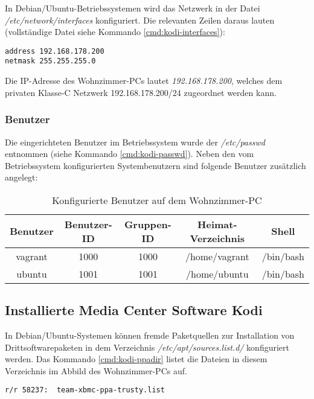 In Debian/Ubuntu-Betriebssystemen wird das Netzwerk in der Datei \textit{/etc/network/interfaces} konfiguriert. Die relevanten Zeilen daraus lauten (vollständige Datei siehe Kommando \autoref{cmd:kodi-interfaces}):

\begin{verbatim}
address 192.168.178.200
netmask 255.255.255.0
\end{verbatim}

Die IP-Adresse des Wohnzimmer-PCs lautet \textit{192.168.178.200}, welches dem privaten \mbox{Klasse-C} Netzwerk 192.168.178.200/24 zugeordnet werden kann.

\subsubsection{Benutzer}
\label{sec:kodi-users}

Die eingerichteten Benutzer im Betriebssystem wurde der \textit{/etc/passwd} entnommen (siehe Kommando \autoref{cmd:kodi-passwd}). Neben den vom Betriebssystem konfigurierten Systembenutzern sind folgende Benutzer zusätzlich angelegt:

\begin{table}[H]
\centering
\begin{tabular}{ccccc}
\toprule
Benutzer & Benutzer-ID & Gruppen-ID & Heimat-Verzeichnis & Shell \\ 
\midrule
vagrant & 1000 & 1000 & /home/vagrant & /bin/bash \\ 
ubuntu & 1001 & 1001 & /home/ubuntu & /bin/bash \\ 
\bottomrule
\end{tabular} 
\caption{Konfigurierte Benutzer auf dem Wohnzimmer-PC}
\end{table}

\subsection{Installierte Media Center Software Kodi}

In Debian/Ubuntu-Systemen können fremde Paketquellen zur Installation von Drittsoftwarepaketen in dem Verzeichnis \textit{/etc/apt/sources.list.d/} konfiguriert werden. Das Kommando \autoref{cmd:kodi-ppadir} listet die Dateien in diesem Verzeichnis im Abbild des Wohnzimmer-PCs auf.

\begin{cmd}[H]
\begin{verbatim}
r/r 58237:	team-xbmc-ppa-trusty.list
\end{verbatim}
\caption{fls -o 2048 kodi.raw 1289}
\label{cmd:kodi-ppadir}
\end{cmd}

